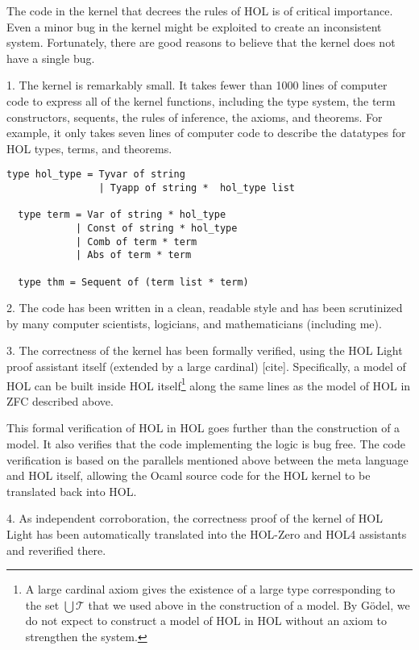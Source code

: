 \documentclass[brochure,english,12pt]{bourbaki}
\theoremstyle{plain}
\def\T{{\mathcal T}}
\begin{document}
The code in the kernel that decrees the rules of HOL is of critical importance.  
Even a minor bug in the kernel might be exploited to create an inconsistent system.  Fortunately,
there are good reasons to believe that the kernel does not have a single bug.

1.  The kernel is remarkably small.  It takes fewer than 1000 lines of computer code to express
all of the kernel functions, including the type system, the term constructors, sequents, the rules of inference,
the axioms, and theorems.  For example, it only takes seven lines of computer code to describe the datatypes
for HOL types, terms, and theorems.

\begin{lstlisting}[keepspaces=true,stringstyle=\tt,basicstyle=\small,frame=single,framesep=8pt,mathescape,morekeywords={type},columns=flexible,caption={Code from the kernel of HOL Light}]
  type hol_type = Tyvar of string
                | Tyapp of string *  hol_type list

  type term = Var of string * hol_type
            | Const of string * hol_type
            | Comb of term * term
            | Abs of term * term

  type thm = Sequent of (term list * term)
\end{lstlisting}

2.  The code has been written in a clean, readable style and has been scrutinized by many computer scientists,
logicians, and mathematicians (including me).

3.  The correctness of the kernel has been formally verified, using the HOL Light proof assistant itself (extended by a large
cardinal) [cite].  Specifically,
a model of HOL can be built inside HOL itself\footnote{A large cardinal axiom 
 gives the existence of a large type corresponding to the set $\bigcup\T$ that we used above in the construction of a model.
By G\"odel, we do not expect to construct a model of HOL in HOL without an axiom to strengthen the system.} along the same
lines as the model of HOL in ZFC described above.  

This formal verification of HOL in HOL goes  further than the construction of a model.
It also verifies that the code implementing the logic is bug free.  The code verification is based on the 
parallels mentioned above between the meta language and HOL itself, allowing the Ocaml source code for the HOL kernel to be
translated back into HOL.

4.  As independent corroboration, the correctness proof of the kernel of HOL Light 
has been automatically translated into the HOL-Zero and HOL4 assistants
and reverified there.
\end{document}

